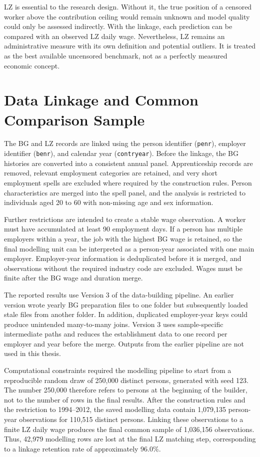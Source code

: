\documentclass[12pt,a4paper,oneside,titlepage]{book}
\begin{document}
LZ is essential to the research design. Without it, the true position of a censored worker above the contribution ceiling would remain unknown and model quality could only be assessed indirectly. With the linkage, each prediction can be compared with an observed LZ daily wage. Nevertheless, LZ remains an administrative measure with its own definition and potential outliers. It is treated as the best available uncensored benchmark, not as a perfectly measured economic concept.

\section{Data Linkage and Common Comparison Sample}
The BG and LZ records are linked using the person identifier (\texttt{penr}), employer identifier (\texttt{benr}), and calendar year (\texttt{contryear}). Before the linkage, the BG histories are converted into a consistent annual panel. Apprenticeship records are removed, relevant employment categories are retained, and very short employment spells are excluded where required by the construction rules. Person characteristics are merged into the spell panel, and the analysis is restricted to individuals aged 20 to 60 with non-missing age and sex information.

Further restrictions are intended to create a stable wage observation. A worker must have accumulated at least 90 employment days. If a person has multiple employers within a year, the job with the highest BG wage is retained, so the final modelling unit can be interpreted as a person-year associated with one main employer. Employer-year information is deduplicated before it is merged, and observations without the required industry code are excluded. Wages must be finite after the BG wage and duration merge.

The reported results use Version 3 of the data-building pipeline. An earlier version wrote yearly BG preparation files to one folder but subsequently loaded stale files from another folder. In addition, duplicated employer-year keys could produce unintended many-to-many joins. Version 3 uses sample-specific intermediate paths and reduces the establishment data to one record per employer and year before the merge. Outputs from the earlier pipeline are not used in this thesis.

Computational constraints required the modelling pipeline to start from a reproducible random draw of 250,000 distinct persons, generated with seed 123. The number 250,000 therefore refers to persons at the beginning of the builder, not to the number of rows in the final results. After the construction rules and the restriction to 1994--2012, the saved modelling data contain 1,079,135 person-year observations for 110,515 distinct persons. Linking these observations to a finite LZ daily wage produces the final common sample of 1,036,156 observations. Thus, 42,979 modelling rows are lost at the final LZ matching step, corresponding to a linkage retention rate of approximately 96.0\%.
\end{document}
